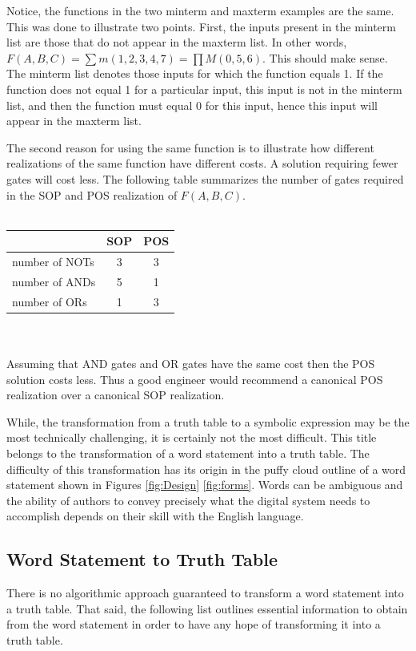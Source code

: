 Notice, the functions in the two minterm and maxterm examples are the 
same.  This was done to illustrate two points.  First, the inputs 
present in the minterm list are those that do not appear in the maxterm 
list.  In other words, $F(A,B,C) = \sum m(1,2,3,4,7) = \prod M (0,5,6)$.  
This should make sense. The minterm list denotes those inputs for 
which the function equals 1.  If the function does not equal 1 for 
a particular input, this input is not in the minterm list, and then the 
function must equal 0 for this input, hence this input will appear 
in the maxterm list.

The second reason for using the same function is to illustrate
how different realizations of the same function have different costs.
A solution requiring fewer gates
will cost less.  The following table summarizes the number of gates 
required in the SOP and POS realization of $F(A,B,C)$.
\\ \\
\begin{tabular}[ht]{l|c|c}
		    & SOP 	& POS	\\ \hline
 number of NOTs & 3	& 3	\\ \hline
 number of ANDs & 5	& 1	\\ \hline
 number of ORs  & 1	& 3	\\ 
\end{tabular}
\\ \\
Assuming that AND gates and OR gates have the same cost then the POS 
solution costs less.  Thus a good engineer would recommend a 
canonical POS realization over a canonical SOP realization.

While, the transformation from a truth table to a symbolic expression
may be the most technically challenging, it is certainly not the
most difficult.  This title belongs to the transformation of a word
statement into a truth table.  The difficulty of this transformation
has its origin in the puffy cloud outline of a word statement shown in
Figures \ref{fig:Design} \ref{fig:forms}. Words can be ambiguous and 
the ability of authors to convey precisely what the digital system
needs to accomplish depends on their skill with the English language.

\subsection{Word Statement to Truth Table}
There is no algorithmic approach guaranteed to transform a word statement 
into a truth table.  That said, the following list outlines essential
information to obtain from the word statement in order to
have any hope of transforming it into a truth table.

